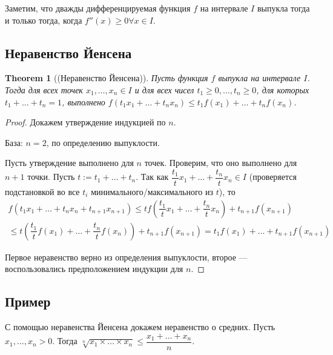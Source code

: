 \documentclass[a4paper]{article}
\theoremstyle{named}
\newtheorem*{namedtheorem}{Theorem}
\begin{document}
        Заметим, что дважды дифференцируемая функция $f$ на интервале $I$ выпукла тогда и только тогда, когда $f''(x) \geq 0 \forall x \in I$.

        \subsection{Неравенство Йенсена}

        \begin{namedtheorem}[(Неравенство Йенсена)]
            Пусть функция $f$ выпукла на интервале $I$. Тогда для всех точек $x_1, \dots, x_n \in I$ и для всех чисел $t_1 \geq 0, \dots, t_n \geq 0$, для которых $t_1 + \dots + t_n = 1$, выполнено $f(t_1x_1 + \dots + t_nx_n) \leq t_1f(x_1) + \dots + t_nf(x_n)$.
        \end{namedtheorem}

        \begin{proof}
            Докажем утверждение индукцией по $n$.

            База: $n = 2$, по определению выпуклости.

            Пусть утверждение выполнено для $n$ точек. Проверим, что оно выполнено для $n + 1$ точки. Пусть $t := t_1 + \dots + t_n$. Так как $\dfrac{t_1}{t}x_1 + \dots + \dfrac{t_n}{t}x_n \in I$ (проверяется подстановкой во все $t_i$ минимального/максимального из $t$), то
            \[\begin{gathered}
                f(t_1x_1 + \dots + t_nx_n + t_{n + 1}x_{n + 1}) \leq tf \left(\dfrac{t_1}{t}x_1 + \dots + \dfrac{t_n}{t}x_n\right) + t_{n + 1}f(x_{n + 1}) \\
                \leq t \left(\dfrac{t_1}{t}f(x_1) + \dots + \dfrac{t_n}{t}f(x_n)\right) + t_{n + 1}f(x_{n + 1}) = t_1f(x_1) + \dots + t_{n + 1}f(x_{n + 1})
            \end{gathered}\]

            Первое неравенство верно из определения выпуклости, второе --- воспользовались предположением индукции для $n$.
        \end{proof}

        \subsection{Пример}

        С помощью неравенства Йенсена докажем неравенство о средних. Пусть $x_1, \dots, x_n > 0$. Тогда $\sqrt[n]{x_1 \times \dots \times x_n} \leq \dfrac{x_1 + \dots + x_n}{n}$.
\end{document}
